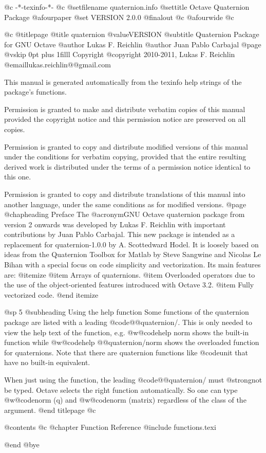    @c -*-texinfo-*-
@c %
@setfilename quaternion.info
@settitle Octave Quaternion Package
@afourpaper
@set VERSION 2.0.0
@finalout
@c @afourwide
@c %

@c %
@titlepage
@title quaternion @value{VERSION}
@subtitle Quaternion Package for GNU Octave
@author Lukas F. Reichlin
@author Juan Pablo Carbajal
@page
@vskip 0pt plus 1filll
Copyright @copyright{} 2010-2011, Lukas F. Reichlin @email{lukas.reichlin@@gmail.com}

This manual is generated automatically from the texinfo help strings
of the package's functions.

Permission is granted to make and distribute verbatim copies of
this manual provided the copyright notice and this permission notice
are preserved on all copies.

Permission is granted to copy and distribute modified versions of this
manual under the conditions for verbatim copying, provided that the entire
resulting derived work is distributed under the terms of a permission
notice identical to this one.

Permission is granted to copy and distribute translations of this manual
into another language, under the same conditions as for modified versions.
@page
@chapheading Preface
The @acronym{GNU} Octave quaternion package from version 2 onwards
was developed by Lukas F. Reichlin with important contributions by
Juan Pablo Carbajal. This new package is intended as a replacement
for quaternion-1.0.0 by A. Scottedward Hodel. It is loosely based
on ideas from the Quaternion Toolbox for Matlab by Steve Sangwine
and Nicolas Le Bihan with a special focus on code simplicity and
vectorization. Its main features are:
@itemize
@item Arrays of quaternions.
@item Overloaded operators due to the use of the object-oriented features
introduced with Octave 3.2.
@item Fully vectorized code.
@end itemize


@sp 5
@subheading Using the help function
Some functions of the quaternion package are listed with a leading @code{@@quaternion/}.
This is only needed to view the help text of the function, e.g. @w{@code{help norm}}
shows the built-in function while @w{@code{help @@quaternion/norm}} shows the overloaded
function for quaternions. Note that there are quaternion functions
like @code{unit} that have no built-in equivalent.

When just using the function, the leading @code{@@quaternion/} must @strong{not} be typed.
Octave selects the right function automatically. So one can type @w{@code{norm (q)}}
and @w{@code{norm (matrix)}} regardless of the class of the argument.
@end titlepage
@c %

@contents
@c @chapter Function Reference
@include functions.texi

@end
@bye
